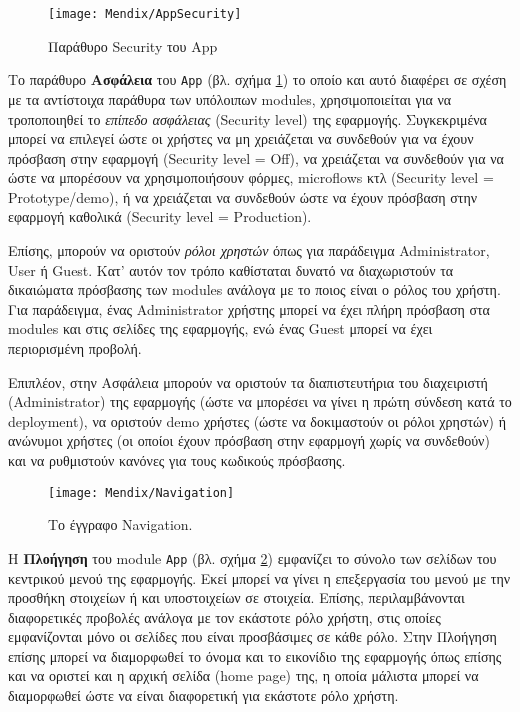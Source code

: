             \begin{figure}[h!] \noindent \centering
                \texttt{[image: Mendix/AppSecurity]}
                \caption{\centering Παράθυρο Security του App}
                \label{fig:MendixAppSecurity}
            \end{figure}

            Το παράθυρο \textbf{Ασφάλεια} του \texttt{App} (βλ. σχήμα \ref{fig:MendixAppSecurity}) το οποίο και αυτό διαφέρει σε σχέση με τα αντίστοιχα παράθυρα των υπόλοιπων modules, χρησιμοποιείται για να τροποποιηθεί το \textit{επίπεδο ασφάλειας} (Security level) της εφαρμογής. Συγκεκριμένα μπορεί να επιλεγεί ώστε οι χρήστες να μη χρειάζεται να συνδεθούν για να έχουν πρόσβαση στην εφαρμογή (Security level = Off), να χρειάζεται να συνδεθούν για να ώστε να μπορέσουν να χρησιμοποιήσουν φόρμες, microflows κτλ (Security level = Prototype/demo), ή να χρειάζεται να συνδεθούν ώστε να έχουν πρόσβαση στην εφαρμογή καθολικά (Security level = Production).

            Επίσης, μπορούν να οριστούν \textit{ρόλοι χρηστών} όπως για παράδειγμα Administrator, User ή Guest. Κατ' αυτόν τον τρόπο καθίσταται δυνατό να διαχωριστούν τα δικαιώματα πρόσβασης των modules ανάλογα με το ποιος είναι ο ρόλος του χρήστη. Για παράδειγμα, ένας Administrator χρήστης μπορεί να έχει πλήρη πρόσβαση στα modules και στις σελίδες της εφαρμογής, ενώ ένας Guest μπορεί να έχει περιορισμένη προβολή.

            Επιπλέον, στην Ασφάλεια μπορούν να οριστούν τα διαπιστευτήρια του διαχειριστή (Administrator) της εφαρμογής (ώστε να μπορέσει να γίνει η πρώτη σύνδεση κατά το deployment), να οριστούν demo χρήστες (ώστε να δοκιμαστούν οι ρόλοι χρηστών) ή ανώνυμοι χρήστες (οι οποίοι έχουν πρόσβαση στην εφαρμογή χωρίς να συνδεθούν) και να ρυθμιστούν κανόνες για τους κωδικούς πρόσβασης.

            \begin{figure}[h!] \noindent \centering
                \texttt{[image: Mendix/Navigation]}
                \caption{\centering Το έγγραφο Navigation.}
                \label{fig:MendixAppNavigation}
            \end{figure}

            Η \textbf{Πλοήγηση} του module \texttt{App} (βλ. σχήμα \ref{fig:MendixAppNavigation}) εμφανίζει το σύνολο των σελίδων του κεντρικού μενού της εφαρμογής. Εκεί μπορεί να γίνει η επεξεργασία του μενού με την προσθήκη στοιχείων ή και υποστοιχείων σε στοιχεία. Επίσης, περιλαμβάνονται διαφορετικές προβολές ανάλογα με τον εκάστοτε ρόλο χρήστη, στις οποίες εμφανίζονται μόνο οι σελίδες που είναι προσβάσιμες σε κάθε ρόλο. Στην Πλοήγηση επίσης μπορεί να διαμορφωθεί το όνομα και το εικονίδιο της εφαρμογής όπως επίσης και να οριστεί και η αρχική σελίδα (home page) της, η οποία μάλιστα μπορεί να διαμορφωθεί ώστε να είναι διαφορετική για εκάστοτε ρόλο χρήστη. \cite{mendixDoc}

